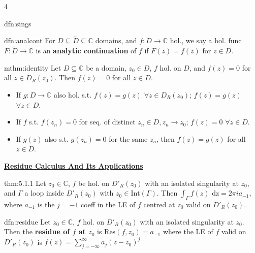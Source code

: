 \documentclass[landscape, 8pt]{extarticle}
\begin{document}
\begin{multicols*}{4}
\begin{dfn}{dfn:sings}{ }
		\end{dfn}
		
		
		\begin{dfn}{dfn:analcont}{ }
			For $D \subseteq \tilde{D} \subseteq \mathbb{C}$ domains, and $f: D \to \mathbb{C}$ hol., we say a hol. func $F: \tilde{D} \to \mathbb{C}$ is an \textbf{analytic continuation} of $f$ if $F(z) = f(z)$ for $z \in D$.
			
			
		\end{dfn}
		
		
		\begin{mthm}{mthm:identity}{ }
			Let $D \subseteq \mathbb{C}$ be a domain, $z_0 \in D$, $f$ hol. on $D$, and $f(z) = 0$ for all $z \in D_R(z_0)$. Then $f(z) = 0$ for all $z \in D$.
			\begin{itemize}
				\item If $g : D \to \mathbb{C}$ also hol. s.t. $f(z) = g(z)$ $\forall z \in D_R(z_0)$; $f(z) = g(z)$ $\forall z \in D$.
				\item If $f$ s.t. $f(z_n) = 0$ for seq. of distinct $z_n \in D, z_n \to z_0$; $f(z) = 0$ $\forall z \in D$.
				\item If $g(z)$ also s.t. $g(z_n) = 0$ for the same $z_n$, then $f(z) = g(z)$ for all $z \in D$.
			\end{itemize}
			
			
		\end{mthm}
		
		
		
		
		
	{\footnotesize \textbf{\underline{Residue Calculus And Its Applications}}}
		
		
		\begin{thm}[5.1.1]{thm:5.1.1}{}
			Let $z_0 \in \mathbb{C}$, $f$ be hol. on $D'_R(z_0)$ with an isolated singularity at $z_0$, and $\Gamma$ a loop inside $D'_R(z_0)$ with $z_0 \in \text{Int}(\Gamma)$.
			Then $\int_{\Gamma} f(z) \text{ dz} = 2 \pi i a_{-1}$, where $a_{-1}$ is the $j= -1$ coeff in the LE of $f$ centred at $z_0$ valid on $D'_R(z_0)$.
			
		\end{thm}
		
		
		\begin{dfn}{dfn:residue}{ }
			Let $z_0 \in \mathbb{C}$, $f$ hol. on $D'_R(z_0)$ with an isolated singularity at $z_0$. \\
			Then the \textbf{residue of $f$ at $z_0$} is $\text{Res}(f, z_0) = a_{-1}$ where the LE of $f$ valid on $D'_R(z_0)$ is $f(z) = \sum_{j= -\infty}^{\infty}a_j(z-z_0)^j$
			

\end{dfn}
\end{multicols*}
\end{document}

